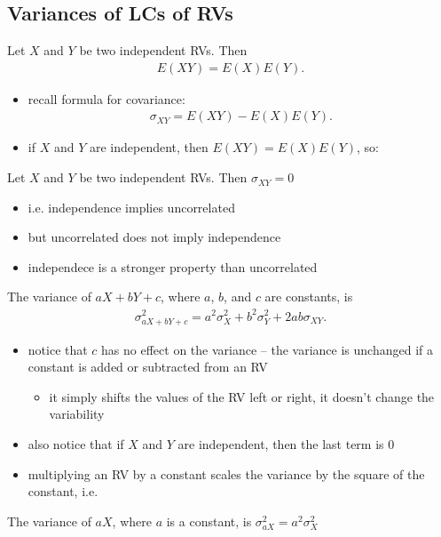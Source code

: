 \documentclass[10pt]{article}
\begin{document}
\subsection{Variances of LCs of RVs}
\begin{theorem}
    Let $X$ and $Y$ be two independent RVs. Then
    \begin{align*}
        E(XY) = E(X)E(Y)
    .\end{align*}
\end{theorem}
\begin{itemize}
    \item recall formula for covariance:
        \begin{align*}
            \sigma_{XY} = E(XY) - E(X)E(Y)
        .\end{align*}
    \item if $X$ and $Y$ are independent, then $E(XY) = E(X)E(Y)$, so:
\end{itemize}
\begin{theorem}
    Let $X$ and $Y$ be two independent RVs. Then $\sigma_{XY} = 0$
\end{theorem}
\begin{itemize}
    \item i.e. independence implies uncorrelated
    \item but uncorrelated does not imply independence
    \item independece is a stronger property than uncorrelated
\end{itemize}
\begin{theorem}
    The variance of $aX + bY + c$, where $a$, $b$, and $c$ are constants, is 
    \begin{align*}
        \sigma_{aX + bY + c}^2 = a^2\sigma_X^2 + b^2\sigma_Y^2 + 2ab\sigma_{XY}
    .\end{align*}
\end{theorem}
\begin{itemize}
    \item notice that $c$ has no effect on the variance -- the variance is unchanged if a constant is added or subtracted from an RV
         \begin{itemize}
            \item it simply shifts the values of the RV left or right, it doesn't change the variability
        \end{itemize}
    \item also notice that if $X$ and $Y$ are independent, then the last term is 0
    \item multiplying an RV by a constant scales the variance by the square of the constant, i.e. 
\end{itemize}
\begin{theorem}
    The variance of $aX$, where $a$ is a constant, is $\sigma^2_{aX} = a^2\sigma_X^2$
\end{theorem}
\end{document}
